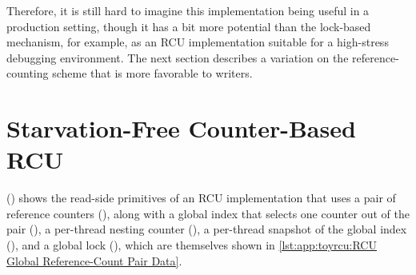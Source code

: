 \QuickQuizEnd

Therefore, it is still hard to imagine this implementation being useful
in a production setting, though it has a bit more potential
than the lock-based mechanism, for example, as an RCU implementation
suitable for a high-stress debugging environment.
The next section describes a variation on the reference-counting
scheme that is more favorable to writers.

\section{Starvation-Free Counter-Based RCU}
\label{sec:app:toyrcu:Starvation-Free Counter-Based RCU}

()
shows the read-side primitives of an RCU implementation that uses a pair
of reference counters (),
along with a global index that
selects one counter out of the pair (),
a per-thread nesting counter (),
a per-thread snapshot of the global index (),
and a global lock (),
which are themselves shown in
\cref{lst:app:toyrcu:RCU Global Reference-Count Pair Data}.

\begin{listing}

\caption{RCU Global Reference-Count Pair Data}
\label{lst:app:toyrcu:RCU Global Reference-Count Pair Data}
\end{listing}

\begin{listing}

\caption{RCU Read-Side Using Global Reference-Count Pair}
\label{lst:app:toyrcu:RCU Read-Side Using Global Reference-Count Pair}
\end{listing}

